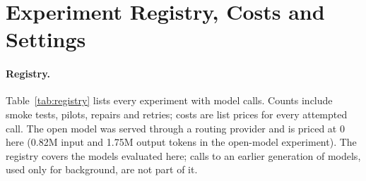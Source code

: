 \section{Experiment Registry, Costs and Settings}\label{app:registry}

\paragraph{Registry.} Table~\ref{tab:registry} lists every experiment with model calls. Counts include smoke tests, pilots, repairs and retries; costs are list prices for every attempted call. The open model was served through a routing provider and is priced at 0 here (0.82M input and 1.75M output tokens in the open-model experiment). The registry covers the models evaluated here; calls to an earlier generation of models, used only for background, are not part of it.


